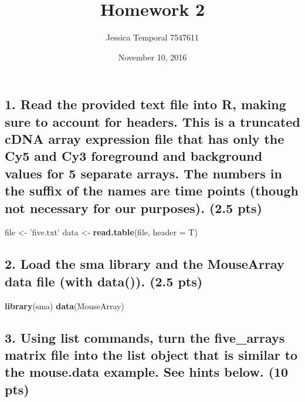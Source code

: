 \documentclass[]{article}
\title{Homework 2}
\author{Jessica Temporal 7547611}
\date{November 10, 2016}
\newenvironment{Shaded}{\begin{snugshade}}{\end{snugshade}}
\newcommand{\KeywordTok}[1]{\textcolor[rgb]{0.13,0.29,0.53}{\textbf{{#1}}}}
\newcommand{\DataTypeTok}[1]{\textcolor[rgb]{0.13,0.29,0.53}{{#1}}}
\newcommand{\StringTok}[1]{\textcolor[rgb]{0.31,0.60,0.02}{{#1}}}
\newcommand{\NormalTok}[1]{{#1}}
\begin{document}
\maketitle

{
\setcounter{tocdepth}{3}
\tableofcontents
}
\newpage

\subsection{1. Read the provided text file into R, making sure to
account for headers. This is a truncated cDNA array expression file that
has only the Cy5 and Cy3 foreground and background values for 5 separate
arrays. The numbers in the suffix of the names are time points (though
not necessary for our purposes). (2.5
pts)}\label{read-the-provided-text-file-into-r-making-sure-to-account-for-headers.-this-is-a-truncated-cdna-array-expression-file-that-has-only-the-cy5-and-cy3-foreground-and-background-values-for-5-separate-arrays.-the-numbers-in-the-suffix-of-the-names-are-time-points-though-not-necessary-for-our-purposes.-2.5-pts}

\begin{Shaded}
\begin{Highlighting}[]
\NormalTok{file <-}\StringTok{ 'five.txt'}
\NormalTok{data <-}\StringTok{ }\KeywordTok{read.table}\NormalTok{(file, }\DataTypeTok{header =} \NormalTok{T)}
\end{Highlighting}
\end{Shaded}

\subsection{2. Load the sma library and the MouseArray data file (with
data()). (2.5
pts)}\label{load-the-sma-library-and-the-mousearray-data-file-with-data.-2.5-pts}

\begin{Shaded}
\begin{Highlighting}[]
\KeywordTok{library}\NormalTok{(sma)}
\KeywordTok{data}\NormalTok{(MouseArray)}
\end{Highlighting}
\end{Shaded}

\subsection{3. Using list commands, turn the five\_arrays matrix file
into the list object that is similar to the mouse.data example. See
hints below. (10
pts)}\label{using-list-commands-turn-the-fiveux5farrays-matrix-file-into-the-list-object-that-is-similar-to-the-mouse.data-example.-see-hints-below.-10-pts}
\end{document}
